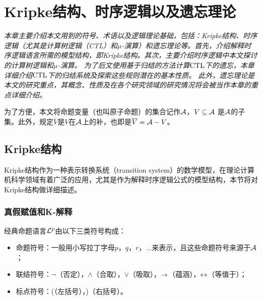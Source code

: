 \chapter{Kripke结构、时序逻辑以及遗忘理论}\label{chapter02}

{\em 本章主要介绍本文用到的符号、术语以及逻辑理论基础，包括：Kripke结构、时序逻辑（尤其是计算树逻辑（CTL）和$\mu$-演算）和遗忘理论等。首先，介绍解释时序逻辑语言所需的模型结构，即Kripke结构。其次，主要介绍时序逻辑中本文探讨的计算树逻辑和$\mu$-演算。
	为了后文使用基于归结的方法计算$\textrm{CTL}$下的遗忘，本章详细介绍$\textrm{CTL}$下的归结系统及探索这些规则潜在的基本性质。
	此外，遗忘理论是本文的研究重点，其概念、性质及在各个研究领域的研究情况将会被当作本章的重点详细介绍。

为了方便，本文将命题变量（也叫原子命题）的集合记作$\cal A$，$V\subseteq {\cal A}$ 是$\cal A$的子集。此外，规定$\overline{V}$是$V$在${\cal A}$上的补，也即是$\overline{V}={\cal A}-V$。}

\section{Kripke结构}
Kripke结构作为一种表示转换系统（transition system）的数学模型，在理论计算机科学领域有着广泛的应用，尤其是作为解释时序逻辑公式的模型结构，本节将对Kripke结构做详细描述。

\subsection{真假赋值和K-解释}
经典命题语言${\cal L}^p$由以下三类符号构成：
\begin{itemize}
	\item 命题符号：一般用小写拉丁字母$p$，$q$，$r$，$\dots$来表示，且这些命题符号来源于${\cal A}$；
	\item 联结符号：$\neg$（否定），$\wedge$（合取），$\vee$（吸取），$\rightarrow$（蕴涵），$\leftrightarrow$（等值于）；
	\item 标点符号：(（左括号），)（右括号）。
\end{itemize}

